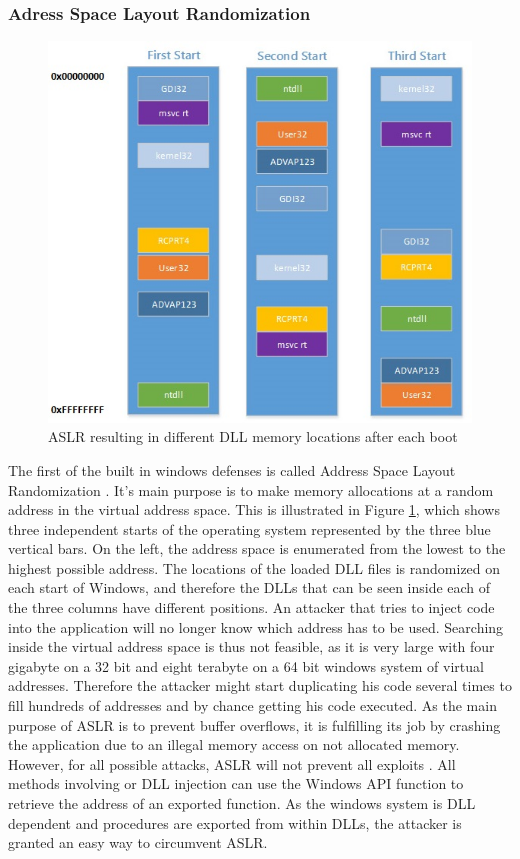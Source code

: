 \subsubsection{Adress Space Layout Randomization}
\begin{figure}[!htbp]
\centering
\includegraphics[width=\textwidth,height=\textheight,keepaspectratio]{sections/background/defenses/aslr.jpg}
\caption{ASLR resulting in different DLL memory locations after each boot}
\label{fig:aslr}
\end{figure}
The first of the built in windows defenses is called Address Space Layout Randomization \cite{miller2009method}. It's main purpose is to make memory allocations at a random address in the virtual address space. This is illustrated in Figure \ref{fig:aslr}, which shows three independent starts of the operating system represented by the three blue vertical bars. On the left, the address space is enumerated from the lowest to the highest possible address. The locations of the loaded DLL files is randomized on each start of Windows, and therefore the DLLs that can be seen inside each of the three columns have different positions. An attacker that tries to inject code into the application will no longer know which address has to be used. Searching inside the virtual address space is thus not feasible, as it is very large with four gigabyte on a 32 bit and eight terabyte on a 64 bit windows system of virtual addresses. Therefore the attacker might start duplicating his code several times to fill hundreds of addresses and by chance getting his code executed. As the main purpose of ASLR is to prevent buffer overflows, it is fulfilling its job by crashing the application due to an illegal memory access on not allocated memory. However, for all possible attacks, ASLR will not prevent all exploits \cite{shacham}. All methods involving  or DLL injection can use the Windows API function  to retrieve the address of an exported function. As the windows system is DLL dependent and procedures are exported from within DLLs, the attacker is granted an easy way to circumvent ASLR.